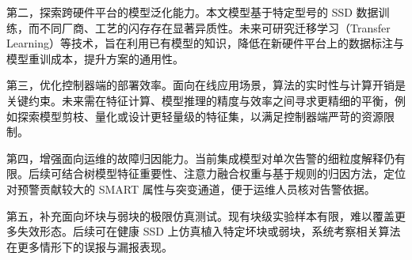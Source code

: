 第二，探索跨硬件平台的模型泛化能力。本文模型基于特定型号的 SSD 数据训练，而不同厂商、工艺的闪存存在显著异质性。未来可研究迁移学习（Transfer Learning）等技术，旨在利用已有模型的知识，降低在新硬件平台上的数据标注与模型重训成本，提升方案的通用性。

第三，优化控制器端的部署效率。面向在线应用场景，算法的实时性与计算开销是关键约束。未来需在特征计算、模型推理的精度与效率之间寻求更精细的平衡，例如探索模型剪枝、量化或设计更轻量级的特征集，以满足控制器端严苛的资源限制。

第四，增强面向运维的故障归因能力。当前集成模型对单次告警的细粒度解释仍有限。后续可结合树模型特征重要性、注意力融合权重与基于规则的归因方法，定位对预警贡献较大的 SMART 属性与突变通道，便于运维人员核对告警依据。

第五，补充面向坏块与弱块的极限仿真测试。现有块级实验样本有限，难以覆盖更多失效形态。后续可在健康 SSD 上仿真植入特定坏块或弱块，系统考察相关算法在更多情形下的误报与漏报表现。